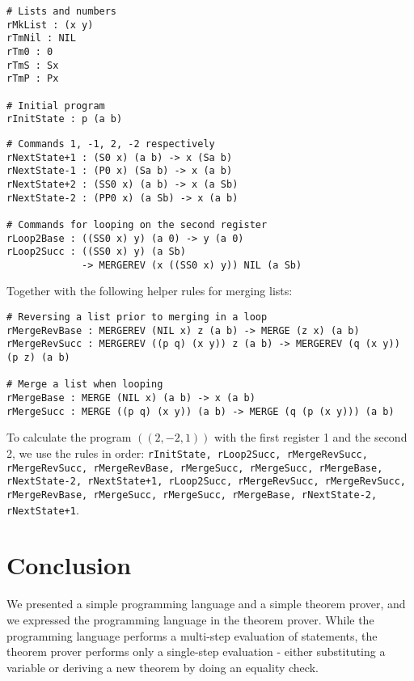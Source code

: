 \documentclass{article}
\begin{document}
\begin{minipage}{0.40\textwidth}
\begin{verbatim}
# Lists and numbers
rMkList : (x y)
rTmNil : NIL
rTm0 : 0
rTmS : Sx
rTmP : Px

# Initial program
rInitState : p (a b)
\end{verbatim}
\end{minipage}
\begin{minipage}{0.58\textwidth}
\begin{verbatim}
# Commands 1, -1, 2, -2 respectively
rNextState+1 : (S0 x) (a b) -> x (Sa b)
rNextState-1 : (P0 x) (Sa b) -> x (a b)
rNextState+2 : (SS0 x) (a b) -> x (a Sb)
rNextState-2 : (PP0 x) (a Sb) -> x (a b)

# Commands for looping on the second register
rLoop2Base : ((SS0 x) y) (a 0) -> y (a 0)
rLoop2Succ : ((SS0 x) y) (a Sb)
             -> MERGEREV (x ((SS0 x) y)) NIL (a Sb)
\end{verbatim}
\end{minipage}

Together with the following helper rules for merging lists:

\begin{verbatim}
# Reversing a list prior to merging in a loop
rMergeRevBase : MERGEREV (NIL x) z (a b) -> MERGE (z x) (a b)
rMergeRevSucc : MERGEREV ((p q) (x y)) z (a b) -> MERGEREV (q (x y)) (p z) (a b)

# Merge a list when looping
rMergeBase : MERGE (NIL x) (a b) -> x (a b)
rMergeSucc : MERGE ((p q) (x y)) (a b) -> MERGE (q (p (x y))) (a b)
\end{verbatim}

To calculate the program $((2, -2, 1))$ with the first register 1 and the second 2, we use the rules in order: \texttt{rInitState, rLoop2Succ, rMergeRevSucc, rMergeRevSucc, rMergeRevBase, rMergeSucc, rMergeSucc, rMergeBase, rNextState-2, rNextState+1, rLoop2Succ, rMergeRevSucc, rMergeRevSucc, rMergeRevBase, rMergeSucc, rMergeSucc, rMergeBase, rNextState-2, rNextState+1}.

\section{Conclusion}

We presented a simple programming language and a simple theorem prover, and we expressed the programming language in the theorem prover. While the programming language performs a multi-step evaluation of statements, the theorem prover performs only a single-step evaluation - either substituting a variable or deriving a new theorem by doing an equality check.
\end{document}
